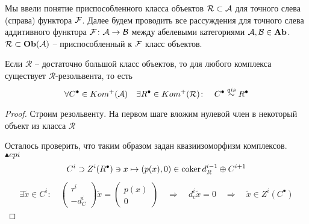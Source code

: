 \documentclass[../main.tex]{subfiles}
\begin{document}
Мы ввели понятие приспособленного класса объектов $\mathcal{R}\subset \mathcal{A}$ для точного слева (справа) функтора $\mathcal{F}$. Далее будем проводить все рассуждения для точного слева аддитивного функтора $\mathcal{F}\colon \mathcal{A} \to \mathcal{B}$ между абелевыми категориями $\mathcal{A}, \mathcal{B} \in \mathbf{Ab}$. $\mathcal{R}\subset \mathbf{Ob}(\mathcal{A})$ -- приспособленный к $\mathcal{F}$ класс объектов.
\begin{to_claim}
 Если $\mathcal{R}$ -- достаточно большой класс объектов, то для любого комплекса существует $\mathcal{R}$-резольвента, то есть
 \[
 \forall C^\bullet \in Kom^{+}(\mathcal{A}) \quad \exists R^\bullet \in Kom^+(\mathcal{R}) \colon \quad C^\bullet \overset{qis}{\sim} R^\bullet
 \]
\end{to_claim}
\begin{proof}
Строим резольвенту. На первом шаге вложим нулевой член в некоторый объект из класса $\mathcal{R}$
\bee
{}
\eee
\bee
{}
\eee
\bee
{}
\eee
Осталось проверить, что таким образом задан квазиизоморфизм комплексов.\\ 
$\blacktriangle epi$
\begin{align*}
    C^i \supset Z^i(R^\bullet) \ni x \mapsto (p(x), 0) \in \operatorname{coker} d^{i-1}_R\oplus C^{i+1}
\end{align*}
\begin{align*}
    \exists \widetilde{x}  \in C^i \colon \quad
                          \begin{pmatrix} \tau^i \\ -d^{i}_C \end{pmatrix} \widetilde{x} = \begin{pmatrix} p(x) \\ 0 \end{pmatrix} \quad \Rightarrow \quad d_c^i\widetilde{x} = 0 \quad \Rightarrow \quad \widetilde{x} \in Z^i(C^\bullet)

\end{align*}
\end{proof}
\end{document}

